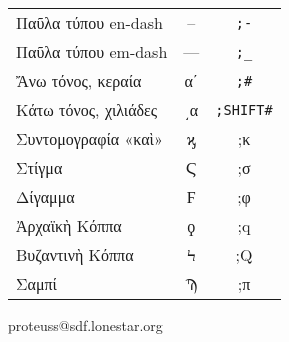 \documentclass[12pt,a4paper]{article}
\begin{document}
\begin{center}
{\begin{tabularx}{12cm}{lcC}
      Παῦλα τύπου en-dash            &  –   &  \texttt{;-}    \\
      Παῦλα τύπου em-dash            &  —   &  \texttt{;{\_}} \\
      Ἄνω τόνος, κεραία              &  αʹ  &  \texttt{;\#}      \\
      Κάτω τόνος, χιλιάδες           & ͵α   &  \texttt{;{\small SHIFT}\#}    \\
      Συντομογραφία «καὶ»            &  ϗ   &  ;κ      \\
      Στίγμα                         &  Ϛ   &  ;σ      \\
      Δίγαμμα                        &  Ϝ   &  ;φ       \\
      Ἀρχαϊκὴ Κόππα                  &  ϙ   &  ;q      \\
      Βυζαντινὴ Κόππα                &  Ϟ   &  ;Q       \\
      Σαμπί                          &  Ϡ   &  ;π      \\\bottomrule
\end{tabularx}
}
\end{center}  
\tiny{proteuss@sdf.lonestar.org}
\end{document}
